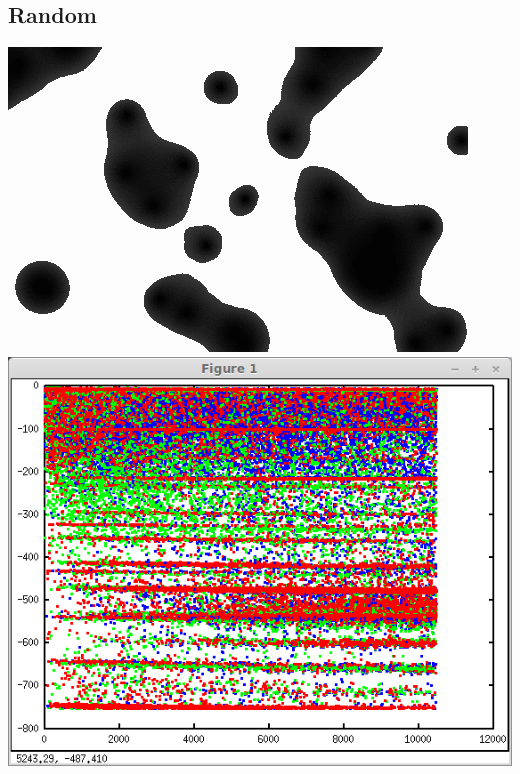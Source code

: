 \documentclass[../r.tex]{subfiles}
\begin{document}
\subsection{Random}
\href{https://twitter.com/randompast/status/889302877113602048}{\includegraphics[scale=0.4]{../TAing/metaballs.png}}
\includegraphics[scale=0.27]{../scientific/50Topics_first3.png} 
\end{document}
